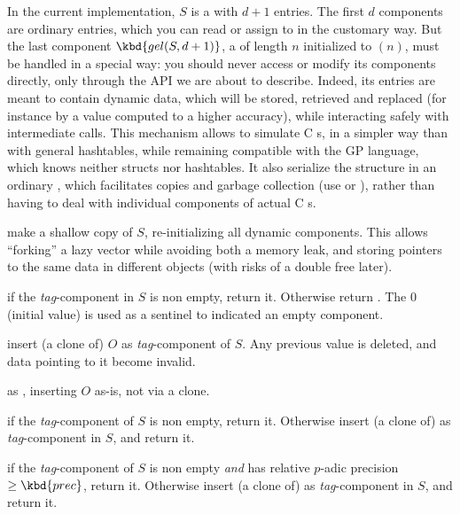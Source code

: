 In the current implementation, $S$ is a  with $d+1$ entries.
The first $d$ components are ordinary  entries, which you can
read or assign to in the customary way. But the last component $\kbd{gel(S,
d+1)}$, a  of length $n$ initialized to $(n)$, must
be handled in a special way: you should never access or modify its components
directly, only through the API we are about to describe. Indeed, its entries
are meant to contain dynamic data, which will be stored, retrieved and
replaced (for instance by a value computed to a higher accuracy), while
interacting safely with intermediate  calls. This mechanism
allows to simulate C s, in a simpler way than with general
hashtables, while remaining compatible with the GP language, which knows
neither structs nor hashtables. It also serialize the structure in an
ordinary , which facilitates copies and garbage collection (use
 or ), rather than having to deal with individual
components of actual C s.

 make a shallow copy of $S$, re-initializing
all dynamic components. This allows ``forking'' a lazy vector while
avoiding both a memory leak, and storing pointers to the same data
in different objects (with risks of a double free later).

 if the \emph{tag}-component in $S$
is non empty, return it. Otherwise return . The  $0$
(initial value) is used as a sentinel to indicated an empty component.

 insert (a clone of) $O$
as \emph{tag}-component of $S$. Any previous value is deleted, and
data pointing to it become invalid.

 as ,
inserting $O$ as-is, not via a clone.

 if the
\emph{tag}-component of $S$ is non empty, return it. Otherwise insert
(a clone of)  as \emph{tag}-component in $S$, and return it.

if the \emph{tag}-component of $S$ is non empty \emph{and} has relative
$p$-adic precision $\geq \kbd{prec}$, return it. Otherwise insert (a clone
of)  as \emph{tag}-component in $S$, and return it.


